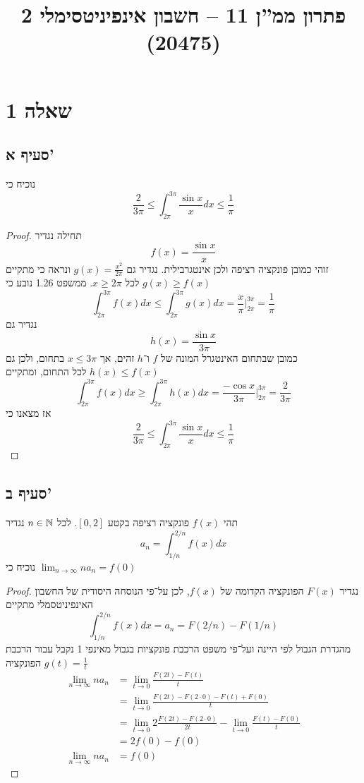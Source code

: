 
\title{פתרון ממ''ן 11 – חשבון אינפיניטסימלי 2 (20475)}


\maketitle
\section{שאלה 1}
\subsection{סעיף א'}
נוכיח כי
\[
	\frac{2}{3\pi} \le \int_{2\pi}^{3\pi} \frac{\sin x}{x} dx \le \frac{1}{\pi}
\]
\begin{proof}
	תחילה נגדיר
	\[
		f(x) = \frac{\sin x}{x}
	\]
	זוהי כמובן פונקציה רציפה ולכן אינטגרבילית.
	נגדיר גם $g(x) = \frac{x^2}{2\pi}$ ונראה כי מתקיים $g(x) \ge f(x)$ לכל $x \ge 2\pi$.
	ממשפט 1.26 נובע כי
	\[
		\int_{2\pi}^{3\pi} f(x) dx \le \int_{2\pi}^{3\pi} g(x) dx = \frac{x}{\pi} \Big|_{2\pi}^{3\pi} = \frac{1}{\pi}
	\]
	נגדיר גם
	\[
		h(x) = \frac{\sin x}{3 \pi}
	\]
	כמובן שבתחום האינטגרל המונה של $f$ ו־$h$ זהים, אך $x \le 3\pi$ בתחום, ולכן גם $h(x) \le f(x)$ לכל התחום, ומתקיים
	\[
		\int_{2\pi}^{3\pi} f(x) dx \ge \int_{2\pi}^{3\pi} h(x) dx = \frac{-\cos x}{3\pi} \Big|_{2\pi}^{3\pi} = \frac{2}{3\pi}
	\]
	אז מצאנו כי
	\[
		\frac{2}{3\pi} \le \int_{2\pi}^{3\pi} \frac{\sin x}{x} dx \le \frac{1}{\pi}
	\]
\end{proof}

\subsection{סעיף ב'}
תהי $f(x)$ פונקציה רציפה בקטע $[0, 2]$. לכל $n \in \mathbb{N}$ נגדיר
\[
	a_n = \int_{1/n}^{2/n} f(x) dx
\]
נוכיח כי $\lim_{n \to \infty} n a_n = f(0)$
\begin{proof}
	נגדיר $F(x)$ הפונקציה הקדומה של $f(x)$, לכן על־פי הנוסחה היסודית של החשבון האינפיניטסמלי מתקיים
	\[
		\int_{1/n}^{2/n} f(x) dx = a_n = F(2/n) - F(1/n)
	\]
	מהגדרת הגבול לפי היינה ועל־פי משפט הרכבת פונקציות בגבול מאינפי 1 נקבל עבור הרכבת הפונקציה $g(t) = \frac{1}{t}$
	\begin{align*}
		\lim_{n \to \infty} n a_n
		& = \lim_{t \to 0} \frac{F(2t) - F(t)}{t} \\
		& = \lim_{t \to 0} \frac{F(2t) - F(2 \cdot 0) - F(t) + F(0)}{t} \\
		& = \lim_{t \to 0} 2\frac{F(2t) - F(2 \cdot 0)}{2t} - \lim_{t \to 0} \frac{F(t) - F(0)}{t} \\
		& = 2 f(0) - f(0) \\ 
		\lim_{n \to \infty} n a_n
		& = f(0)
	\end{align*}
\end{proof}


